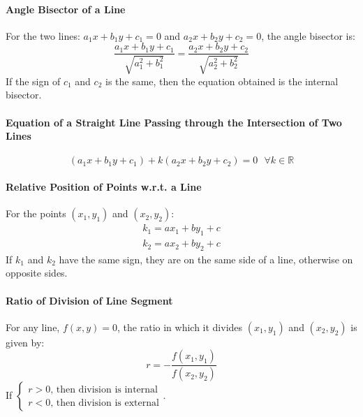\paragraph{Angle Bisector of a Line}
For the two lines: $a_1x+b_1y+c_1=0$ and $a_2x+b_2y+c_2=0$, the angle bisector is:
\begin{equation}
	\dfrac{a_1x+b_1y+c_1}{\sqrt{a_1^2+b_1^2}}=\dfrac{a_2x+b_2y+c_2}{\sqrt{a_2^2+b_2^2}}
\end{equation}
If the sign of $c_1$ and $c_2$ is the same, then the equation obtained is the internal bisector.

\paragraph{Equation of a Straight Line Passing through the Intersection of Two Lines\newline}
\begin{equation}
	(a_1x+b_1y+c_1)+k(a_2x+b_2y+c_2)=0\text{ }\forall k\in\mathbb{R}
\end{equation}

\paragraph{Relative Position of Points w.r.t. a Line}
For the points $(x_1,y_1)$ and $(x_2,y_2)$:
\begin{align}
	k_1=ax_1+by_1+c\nonumber\\
	k_2=ax_2+by_2+c\nonumber
\end{align}
If $k_1$ and $k_2$ have the same sign, they are on the same side of a line, otherwise on opposite sides.

\paragraph{Ratio of Division of Line Segment}
For any line, $f(x,y)=0$, the ratio in which it divides $(x_1,y_1)$ and $(x_2,y_2)$ is given by:
\begin{equation}
	r=-\dfrac{f(x_1,y_1)}{f(x_2,y_2)}
\end{equation}
If $\begin{cases}r>0\text{, then division is internal}\\r<0\text{, then division is external}\end{cases}$.
